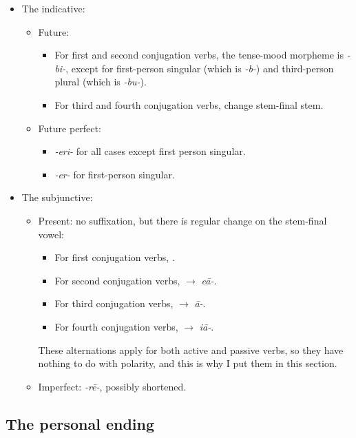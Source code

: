 \documentclass[a4paper, oneside, 12pt]{report}
\newcommand{\form}[1]{\emph{#1}}
\begin{document}
\begin{itemize}
    \item The indicative:
    \begin{itemize}
        \item Future: 
        \begin{itemize}
            \item For first and second conjugation verbs, 
            the tense-mood morpheme is \form{-bi-}, except for 
            first-person singular (which is \form{-b-})
            and third-person plural (which is \form{-bu-}).
            \item For third and fourth conjugation verbs, change stem-final stem.
        \end{itemize}
        \item Future perfect: 
        \begin{itemize}
            \item \form{-eri-} for all cases except first person singular.
            \item \form{-er-} for first-person singular.
        \end{itemize}
    \end{itemize}
    \item The subjunctive:
    \begin{itemize}
        \item Present: no suffixation, but there is regular change on the stem-final vowel:
        \begin{itemize}
            \item For first conjugation verbs, .
            \item For second conjugation verbs, \form{} $\to$ \form{e\={a}-}.
            \item For third conjugation verbs, $\to$ \form{\={a}-}.
            \item For fourth conjugation verbs, $\to$ \form{i\={a}-}.
        \end{itemize}
        These alternations apply for both active and passive verbs,
        so they have nothing to do with polarity, and this is why I put them in this section.
        \item Imperfect: \form{-r\={e}-}, possibly shortened.
    \end{itemize}
\end{itemize}

\subsection{The personal ending}
\end{document}
